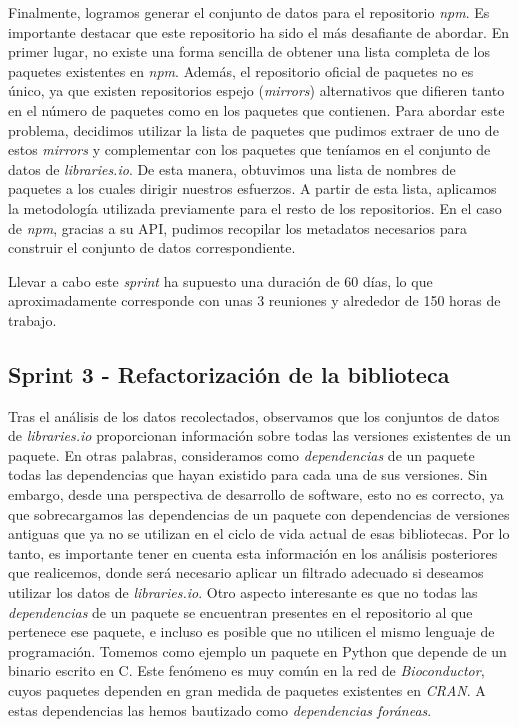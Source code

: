 Finalmente, logramos generar el conjunto de datos para el repositorio \textit{npm}. Es importante destacar que este 
repositorio ha sido el más desafiante de abordar. En primer lugar, no existe una forma sencilla de obtener una lista 
completa de los paquetes existentes en \textit{npm}. Además, el repositorio oficial de paquetes no es único, ya que 
existen repositorios espejo (\textit{mirrors}) alternativos que difieren tanto en el número de paquetes como en los 
paquetes que contienen. Para abordar este problema, decidimos utilizar la lista de paquetes que pudimos extraer de 
uno de estos \textit{mirrors} y complementar con los paquetes que teníamos en el conjunto de datos de \textit{libraries.io}. 
De esta manera, obtuvimos una lista de nombres de paquetes a los cuales dirigir nuestros esfuerzos. A partir de esta 
lista, aplicamos la metodología utilizada previamente para el resto de los repositorios. En el caso de \textit{npm}, 
gracias a su API, pudimos recopilar los metadatos necesarios para construir el conjunto de datos correspondiente.

Llevar a cabo este \textit{sprint} ha supuesto una duración de 60 días, lo que aproximadamente corresponde con unas 
3 reuniones y alrededor de 150 horas de trabajo.

\subsection{Sprint 3 - Refactorización de la biblioteca}

Tras el análisis de los datos recolectados, observamos que los conjuntos de datos de \textit{libraries.io} proporcionan 
información sobre todas las versiones existentes de un paquete. En otras palabras, consideramos como \textit{dependencias} 
de un paquete todas las dependencias que hayan existido para cada una de sus versiones. Sin embargo, desde una perspectiva 
de desarrollo de software, esto no es correcto, ya que sobrecargamos las dependencias de un paquete con dependencias de 
versiones antiguas que ya no se utilizan en el ciclo de vida actual de esas bibliotecas. Por lo tanto, es importante tener 
en cuenta esta información en los análisis posteriores que realicemos, donde será necesario aplicar un filtrado adecuado 
si deseamos utilizar los datos de \textit{libraries.io}.
Otro aspecto interesante es que no todas las \textit{dependencias} de un paquete se encuentran presentes en el repositorio 
al que pertenece ese paquete, e incluso es posible que no utilicen el mismo lenguaje de programación. Tomemos como ejemplo 
un paquete en Python que depende de un binario escrito en C. Este fenómeno es muy común en la red de \textit{Bioconductor}, 
cuyos paquetes dependen en gran medida de paquetes existentes en \textit{CRAN}. 
A estas dependencias las hemos bautizado como \textit{dependencias foráneas}.

